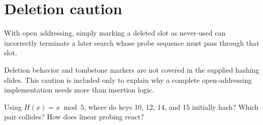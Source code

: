 \section{Deletion caution}

With open addressing, simply marking a deleted slot as never-used can incorrectly terminate a later search whose probe sequence must pass through that slot.

\begin{clarification}
Deletion behavior and tombstone markers are not covered in the supplied hashing slides. This caution is included only to explain why a complete open-addressing implementation needs more than insertion logic.
\end{clarification}

\begin{quickcheck}
Using $H(x)=x\bmod5$, where do keys 10, 12, 14, and 15 initially hash? Which pair collides? How does linear probing react?
\end{quickcheck}


